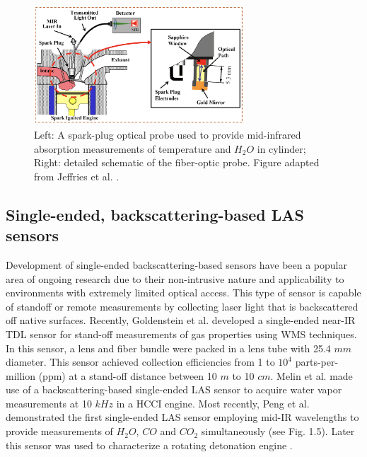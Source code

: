 \vspace{30mm}

\begin{figure}[ht]
    \centering
        \includegraphics[width=0.7\textwidth]{fig/ch1_fig3.png}
        \caption{Left: A spark-plug optical probe used to provide mid-infrared absorption measurements of temperature and $H_2O$ in cylinder; Right: detailed schematic of the fiber-optic probe. Figure adapted from Jeffries et al. \cite{Jeffries2010}.}
    \label{fig:ch1_4}
\end{figure}

\subsection{Single-ended, backscattering-based LAS sensors}
Development of single-ended backscattering-based sensors have been a popular area of ongoing research due to their non-intrusive nature and applicability to environments with extremely limited optical access. This type of sensor is capable of standoff or remote measurements by collecting laser light that is backscattered off native surfaces. Recently, Goldenstein et al. \cite{Goldenstein:16} developed a single-ended near-IR TDL sensor for stand-off measurements of gas properties using WMS techniques. In this sensor, a lens and fiber bundle were packed in a lens tube with 25.4 $mm$ diameter. This sensor achieved collection efficiencies from 1 to $10^4$ parts-per-million (ppm) at a stand-off distance between 10 $m$ to 10 $cm$. Melin et al. \cite{Melin2017} made use of a backscattering-based single-ended LAS sensor to acquire water vapor measurements at 10 $kHz$ in a HCCI engine. Most recently, Peng et al.  \cite{Peng:16} demonstrated the first single-ended LAS sensor employing mid-IR wavelengths to provide measurements of $H_2O$, $CO$ and $CO_2$ simultaneously (see Fig. 1.5). Later this sensor was used to characterize a rotating detonation engine \cite{Peng2018}.


